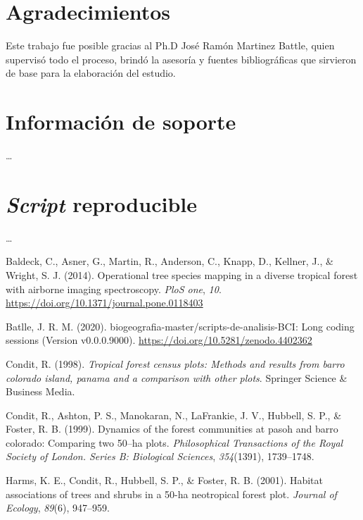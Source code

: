 \documentclass[11pt,]{article}
\begin{document}
\section{Agradecimientos}\label{agradecimientos}

Este trabajo fue posible gracias al Ph.D José Ramón Martinez Battle,
quien supervisó todo el proceso, brindó la asesoría y fuentes
bibliográficas que sirvieron de base para la elaboración del estudio.

\section{Información de soporte}\label{informaciuxf3n-de-soporte}

\ldots

\section{\texorpdfstring{\emph{Script}
reproducible}{Script reproducible}}\label{script-reproducible}

\ldots

\hypertarget{refs}{}
\hypertarget{ref-inproceedings}{}
Baldeck, C., Asner, G., Martin, R., Anderson, C., Knapp, D., Kellner,
J., \& Wright, S. J. (2014). Operational tree species mapping in a
diverse tropical forest with airborne imaging spectroscopy. \emph{PloS
one}, \emph{10}. \url{https://doi.org/10.1371/journal.pone.0118403}

\hypertarget{ref-jose_ramon_martinez_batlle_2020_4402362}{}
Batlle, J. R. M. (2020). biogeografia-master/scripts-de-analisis-BCI:
Long coding sessions (Version v0.0.0.9000).
\url{https://doi.org/10.5281/zenodo.4402362}

\hypertarget{ref-condit1998tropical}{}
Condit, R. (1998). \emph{Tropical forest census plots: Methods and
results from barro colorado island, panama and a comparison with other
plots}. Springer Science \& Business Media.

\hypertarget{ref-condit1999dynamics}{}
Condit, R., Ashton, P. S., Manokaran, N., LaFrankie, J. V., Hubbell, S.
P., \& Foster, R. B. (1999). Dynamics of the forest communities at pasoh
and barro colorado: Comparing two 50--ha plots. \emph{Philosophical
Transactions of the Royal Society of London. Series B: Biological
Sciences}, \emph{354}(1391), 1739--1748.

\hypertarget{ref-harms2001habitat}{}
Harms, K. E., Condit, R., Hubbell, S. P., \& Foster, R. B. (2001).
Habitat associations of trees and shrubs in a 50-ha neotropical forest
plot. \emph{Journal of Ecology}, \emph{89}(6), 947--959.
\end{document}
